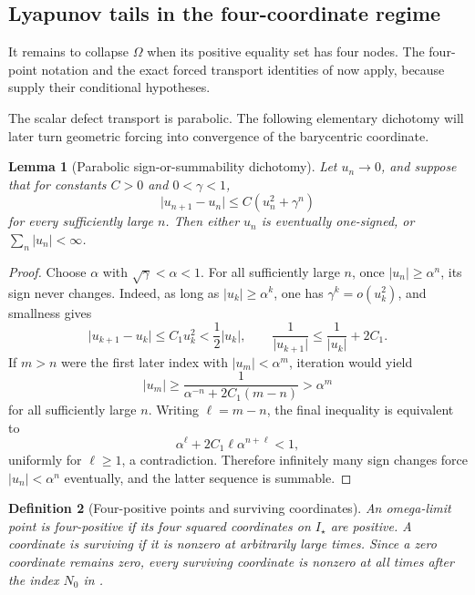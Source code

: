\documentclass[11pt]{article}
\newtheorem{lemma}{Lemma}[section]
\newtheorem{definition}[lemma]{Definition}
\begin{document}
\subsection{Lyapunov tails in the four-coordinate regime}

It remains to collapse \(\Omega\) when its positive equality set has four
nodes.  The four-point notation and the exact forced transport identities
of  now apply, because
 supply their conditional hypotheses.

The scalar defect transport is parabolic.  The following elementary
dichotomy will later turn geometric forcing into convergence of the
barycentric coordinate.

\begin{lemma}[Parabolic sign-or-summability dichotomy]
\label{lem:parabolic-dichotomy}
Let \(u_n\to0\), and suppose that for constants \(C>0\) and
\(0<\gamma<1\),
\[
 \lvert u_{n+1}-u_n\rvert\leq C(u_n^2+\gamma^n)
\]
for every sufficiently large \(n\).  Then either \(u_n\) is eventually
one-signed, or \(\sum_n\lvert u_n\rvert<\infty\).
\end{lemma}

\begin{proof}
Choose \(\alpha\) with \(\sqrt\gamma<\alpha<1\).  For all sufficiently
large \(n\), once \(\lvert u_n\rvert\geq\alpha^n\), its sign never changes.
Indeed, as long as \(\lvert u_k\rvert\geq\alpha^k\), one has
\(\gamma^k=o(u_k^2)\), and smallness gives
\[
 \lvert u_{k+1}-u_k\rvert\leq C_1u_k^2<\frac12\lvert u_k\rvert,
 \qquad
 \frac1{\lvert u_{k+1}\rvert}
 \leq\frac1{\lvert u_k\rvert}+2C_1.
\]
If \(m>n\) were the first later index with
\(\lvert u_m\rvert<\alpha^m\), iteration would yield
\[
 \lvert u_m\rvert
 \geq\frac1{\alpha^{-n}+2C_1(m-n)}>\alpha^m
\]
for all sufficiently large \(n\).  Writing \(\ell=m-n\), the final
inequality is equivalent to
\[
 \alpha^\ell+2C_1\ell\alpha^{n+\ell}<1,
\]
uniformly for \(\ell\geq1\), a contradiction.  Therefore infinitely many
sign changes force \(\lvert u_n\rvert<\alpha^n\) eventually, and the latter
sequence is summable.
\end{proof}

\begin{definition}[Four-positive points and surviving coordinates]
\label{def:four-positive-surviving}
An omega-limit point is \emph{four-positive} if its four squared
coordinates on \(I_\star\) are positive.  A coordinate is
\emph{surviving} if it is nonzero at arbitrarily large times.  Since a zero
coordinate remains zero, every surviving coordinate is nonzero at all
times after the index \(N_0\) in .
\end{definition}
\end{document}
